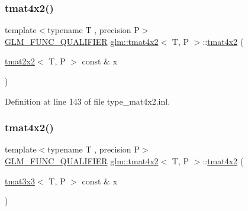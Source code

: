 \mbox{\label{structglm_1_1tmat4x2_adf75877dc039cf1917ba16de5be8510e}} 
\subsubsection{\texorpdfstring{tmat4x2()}{tmat4x2()}\hspace{0.1cm}{\footnotesize\ttfamily [11/22]}}
{\footnotesize\ttfamily template$<$typename T , precision P$>$ \\
\mbox{\hyperlink{setup_8hpp_a33fdea6f91c5f834105f7415e2a64407}{G\+L\+M\+\_\+\+F\+U\+N\+C\+\_\+\+Q\+U\+A\+L\+I\+F\+I\+ER}} \mbox{\hyperlink{structglm_1_1tmat4x2}{glm\+::tmat4x2}}$<$ T, P $>$\+::\mbox{\hyperlink{structglm_1_1tmat4x2}{tmat4x2}} (\begin{DoxyParamCaption}\item[{\mbox{\hyperlink{structglm_1_1tmat2x2}{tmat2x2}}$<$ T, P $>$ const \&}]{x }\end{DoxyParamCaption})}



Definition at line 143 of file type\+\_\+mat4x2.\+inl.

\mbox{\label{structglm_1_1tmat4x2_ac17d0b3d38b30480a59583b8821fe5c2}} 
\subsubsection{\texorpdfstring{tmat4x2()}{tmat4x2()}\hspace{0.1cm}{\footnotesize\ttfamily [12/22]}}
{\footnotesize\ttfamily template$<$typename T , precision P$>$ \\
\mbox{\hyperlink{setup_8hpp_a33fdea6f91c5f834105f7415e2a64407}{G\+L\+M\+\_\+\+F\+U\+N\+C\+\_\+\+Q\+U\+A\+L\+I\+F\+I\+ER}} \mbox{\hyperlink{structglm_1_1tmat4x2}{glm\+::tmat4x2}}$<$ T, P $>$\+::\mbox{\hyperlink{structglm_1_1tmat4x2}{tmat4x2}} (\begin{DoxyParamCaption}\item[{\mbox{\hyperlink{structglm_1_1tmat3x3}{tmat3x3}}$<$ T, P $>$ const \&}]{x }\end{DoxyParamCaption})}



